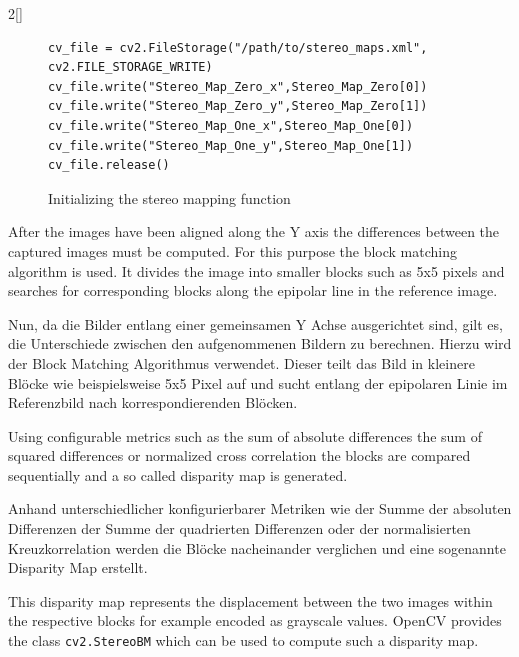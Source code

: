\begin{paracol}{2}[]
\begin{figure}
\begin{lstlisting}[style=shell]
cv_file = cv2.FileStorage("/path/to/stereo_maps.xml", cv2.FILE_STORAGE_WRITE)
cv_file.write("Stereo_Map_Zero_x",Stereo_Map_Zero[0])
cv_file.write("Stereo_Map_Zero_y",Stereo_Map_Zero[1])
cv_file.write("Stereo_Map_One_x",Stereo_Map_One[0])
cv_file.write("Stereo_Map_One_y",Stereo_Map_One[1])
cv_file.release()
	\end{lstlisting}
	\caption{Initializing the stereo mapping function}
	\label{ListingInitUndistortRectifyMap}
\end{figure}
\FloatBarrier

\renewcommand{\deutschertitel}{Tiefenerkennung}
\renewcommand{\englischertitel}{Depth Estimation}
\makroabschnitt
\label{AbschnittStereoVisionTiefenerkennung}

After the images have been aligned along the Y axis the differences between the captured images must be computed. For this purpose the block matching algorithm is used. It divides the image into smaller blocks such as 5x5 pixels and searches for corresponding blocks along the epipolar line in the reference image.

\colger

Nun, da die Bilder entlang einer gemeinsamen Y Achse ausgerichtet sind, gilt es, die Unterschiede zwischen den aufgenommenen Bildern zu berechnen. Hierzu wird der Block Matching Algorithmus verwendet. Dieser teilt das Bild in kleinere Blöcke wie beispielsweise 5x5 Pixel auf und sucht entlang der epipolaren Linie im Referenzbild nach korrespondierenden Blöcken.

\coleng

Using configurable metrics such as the sum of absolute differences the sum of squared differences or normalized cross correlation the blocks are compared sequentially and a so called disparity map is generated.

\colger

Anhand unterschiedlicher konfigurierbarer Metriken wie der Summe der absoluten Differenzen der Summe der quadrierten Differenzen oder der normalisierten Kreuzkorrelation werden die Blöcke nacheinander verglichen und eine sogenannte Disparity Map erstellt.

\coleng

This disparity map represents the displacement between the two images within the respective blocks for example encoded as grayscale values. OpenCV provides the class \texttt{cv2.StereoBM} which can be used to compute such a disparity map.

\colger


\end{paracol}
